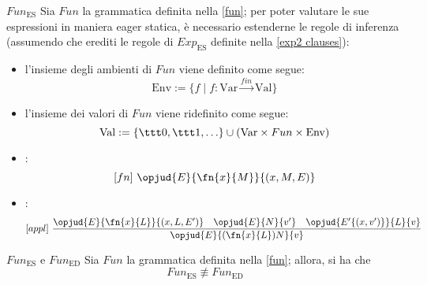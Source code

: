 \documentclass[a4paper, 12pt]{report}
\begin{document}
    \begin{framedprop}[breakable]{$Fun_\mathrm{ES}$}
        Sia $Fun$ la grammatica definita nella \cref{fun}; per poter valutare le sue espressioni in maniera eager statica, è necessario estenderne le regole di inferenza (assumendo che erediti le regole di $Exp_\mathrm{ES}$ definite nella \cref{exp2 clauses}):

        \begin{itemize}
            \item l'insieme degli ambienti di $Fun$ viene definito come segue: $$\mathrm{Env} := \{f \mid f : \mathrm{Var} \xrightarrow{fin} \mathrm{Val}\}$$
            \item l'insieme dei valori di $Fun$ viene ridefinito come segue: $$\mathrm{Val} := \{ \ttt 0, \ttt 1, \ldots \} \cup (\mathrm{Var} \times Fun \times \mathrm{Env})$$
            \item {}: $$[fn] \ \opjud{E}{\fn{x}{M}}{(x,M,E)}$$
            \item {}: $$[appl] \ \dfrac{\opjud{E}{\fn{x}{L}}{(x, L, E')} \quad \opjud{E}{N}{v'} \quad \opjud{E'\{(x,v')\}}{L}{v}}{\opjud{E}{(\fn{x}{L})N}{v}}$$
        \end{itemize}
    \end{framedprop}

    \begin{framedlem}[label={fun lemma pt1}]{$Fun_\mathrm{ES}$ e $Fun_\mathrm{ED}$}
        Sia $Fun$ la grammatica definita nella \cref{fun}; allora, si ha che $$Fun_\mathrm{ES} \not\equiv Fun_\mathrm{ED}$$
    \end{framedlem}
\end{document}
